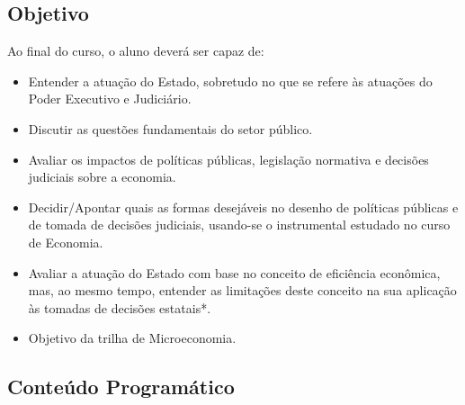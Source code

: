 \documentclass[a4paper,12pt]{article}[abntex2]
\begin{document}
\subsection*{\textbf{Objetivo}}
Ao final do curso, o aluno deverá ser capaz de: \begin{itemize}
    \item Entender a atuação do Estado, sobretudo no que se refere às atuações do Poder Executivo e Judiciário.
    \item Discutir as questões fundamentais do setor público.
    \item Avaliar os impactos de políticas públicas, legislação normativa e decisões judiciais sobre a economia.
    \item Decidir/Apontar quais as formas desejáveis no desenho de políticas públicas e de tomada de decisões judiciais, usando-se o instrumental estudado no curso de Economia.
    \item Avaliar a atuação do Estado com base no conceito de eficiência econômica, mas, ao mesmo tempo, entender as limitações deste conceito na sua aplicação às tomadas de decisões estatais*.
    \item Objetivo da trilha de Microeconomia.
\end{itemize}

\subsection*{\textbf{Conteúdo Programático}}
\end{document}
